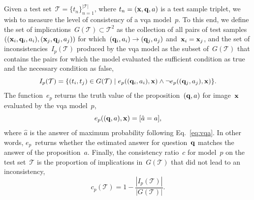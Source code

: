 Given a test set~$\mathcal{T}= \{t_n\}_{n=1}^{|\mathcal{T}|}$, where $t_n=(\mathbf{x}, \mathbf{q}, a)$ is a test sample triplet, we wish to measure the level of consistency of a \gls{vqa} model~$p$. To this end, we define the set of implications~$G(\mathcal{T}) \subset \mathcal{T}^2$ as the collection of all pairs of test samples~$((\mathbf{x}_i, \mathbf{q}_i, a_i), (\mathbf{x}_j, \mathbf{q}_j, a_j))$ for which~$(\mathbf{q}_i, a_i) \rightarrow (\mathbf{q}_j, a_j)$ and~$\mathbf{x}_i=\mathbf{x}_j$,
and the set of inconsistencies~$I_p(\mathcal{T})$ produced by the \gls{vqa} model as the subset of~$G(\mathcal{T})$ that contains the pairs for which the model evaluated the sufficient condition as true and the necessary condition as false,
\begin{equation}
    \nonumber
    I_p(\mathcal{T}) = \{ (t_i, t_j)\in G(\mathcal{T})\mid
     e_p((\mathbf{q}_i, a_i), \mathbf{x}) \wedge \neg e_p((\mathbf{q}_j, a_j), \mathbf{x})\}.
\end{equation}
The function~$e_p$ returns the truth value of the proposition~$(\mathbf{q}, a)$ for image~$\mathbf{x}$ evaluated by the \gls{vqa} model~$p$,
\begin{equation}
    e_p((\mathbf{q}, a), \mathbf{x}) = [\hat{a}=a],
\end{equation}
where $\hat{a}$ is the answer of maximum probability following Eq.~\eqref{eq:vqa}. In other words, $e_p$~returns whether the estimated answer for question~$\mathbf{q}$ matches the answer of the proposition~$a$.
Finally, the consistency ratio~$c$ for model~$p$ on the test set~$\mathcal{T}$ is the proportion of implications in~$G(\mathcal{T})$ that did not lead to an inconsistency,
\begin{equation}
    c_p(\mathcal{T}) = 1 - \dfrac{|I_p(\mathcal{T})|}{|G(\mathcal{T})|}.
\end{equation}


